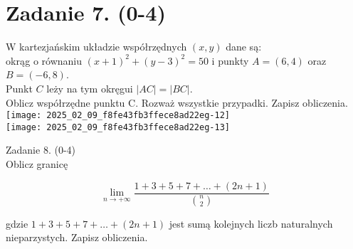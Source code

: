 \documentclass[10pt]{article}
\begin{document}
\section*{Zadanie 7. (0-4)}
W kartezjańskim układzie współrzędnych \((x, y)\) dane są:\\
okrąg o równaniu \((x+1)^{2}+(y-3)^{2}=50\) i punkty \(A=(6,4)\) oraz \(B=(-6,8)\).\\
Punkt \(C\) leży na tym okręgui \(|A C|=|B C|\).\\
Oblicz współrzędne punktu C. Rozważ wszystkie przypadki. Zapisz obliczenia.\\
\texttt{[image: 2025\_02\_09\_f8fe43fb3ffece8ad22eg-12]}\\
\texttt{[image: 2025\_02\_09\_f8fe43fb3ffece8ad22eg-13]}

Zadanie 8. (0-4)\\
Oblicz granicę

\[
\lim _{n \rightarrow+\infty} \frac{1+3+5+7+\ldots+(2 n+1)}{\binom{n}{2}}
\]

gdzie \(1+3+5+7+\ldots+(2 n+1)\) jest sumą kolejnych liczb naturalnych nieparzystych. Zapisz obliczenia.
\end{document}
